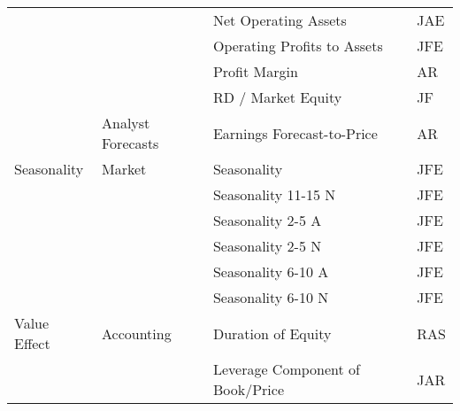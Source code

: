 \begin{tabular}{lllll}
             &            & Net Operating Assets &    \cite{hirshleifer2004investors} &     JAE \\
             &            & Operating Profits to Assets &            \cite{ball2016accruals} &     JFE \\
             &            & Profit Margin &              \cite{soliman2008use} &      AR \\
             &            & RD / Market Equity &               \cite{chan2001stock} &      JF \\
             & Analyst Forecasts & Earnings Forecast-to-Price &           \cite{elgers2001delayed} &      AR \\
Seasonality & Market & Seasonality &       \cite{heston2008seasonality} &     JFE \\
             &            & Seasonality 11-15 N &       \cite{heston2008seasonality} &     JFE \\
             &            & Seasonality 2-5 A &       \cite{heston2008seasonality} &     JFE \\
             &            & Seasonality 2-5 N &       \cite{heston2008seasonality} &     JFE \\
             &            & Seasonality 6-10 A &       \cite{heston2008seasonality} &     JFE \\
             &            & Seasonality 6-10 N &       \cite{heston2008seasonality} &     JFE \\
Value Effect & Accounting & Duration of Equity &           \cite{dechow2004implied} &     RAS \\
             &            & Leverage Component of Book/Price &              \cite{penman2007book} &     JAR \\
\bottomrule
\end{tabular}
